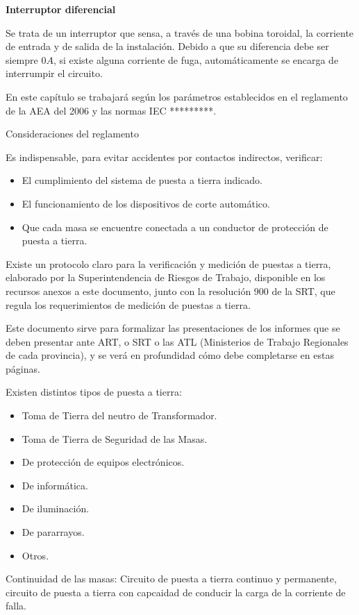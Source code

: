 \textbf{Interruptor diferencial}

Se trata de un interruptor que sensa, a través de una bobina toroidal, la corriente de entrada y de salida de la instalación. Debido a que su diferencia debe ser siempre $0 A$, si existe alguna corriente de fuga, automáticamente se encarga de interrumpir el circuito.

En este capítulo se trabajará según los parámetros establecidos en el reglamento de la AEA del 2006 y las normas IEC *********.

Consideraciones del reglamento

Es indispensable, para evitar accidentes por contactos indirectos, verificar:
\begin{itemize}
	\item El cumplimiento del sistema de puesta a tierra indicado.
	\item El funcionamiento de los dispositivos de corte automático.
	\item Que cada masa se encuentre conectada a un conductor de protección de puesta a tierra.
\end{itemize}

Existe un protocolo claro para la verificación y medición de puestas a tierra, elaborado por la Superintendencia de Riesgos de Trabajo, disponible en los recursos anexos a este documento, junto con la resolución 900 de la SRT, que regula los requerimientos de medición de puestas a tierra.

Este documento sirve para formalizar las presentaciones de los informes que se deben presentar ante ART, o SRT o las ATL (Ministerios de Trabajo Regionales de cada provincia), y se verá en profundidad cómo debe completarse en estas páginas.

Existen distintos tipos de puesta a tierra:
\begin{itemize}
	\item Toma de Tierra del neutro de Transformador.
	\item Toma de Tierra de Seguridad de las Masas.
	\item De protección de equipos electrónicos.
	\item De informática.
	\item De iluminación.
	\item De pararrayos.
	\item Otros.
\end{itemize}

Continuidad de las masas: Circuito de puesta a tierra continuo y permanente, circuito de puesta a tierra con capcaidad de conducir la carga de la corriente de falla.

